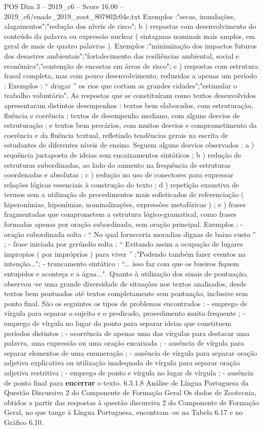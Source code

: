 \begin{textsample}{POS Dim 3 – 2019\_c6 – Score 16.00 – 2019\_c6/enade\_2019\_zoot\_807802c04e.txt}
Exemplos :"secas, inundações, alagamentos";"redução dos níveis de risco"; b ) respostas com desenvolvimento do conteúdo da palavra ou expressão nuclear ( sintagmas nominais mais amplos, em geral de mais de quatro palavras ).
Exemplos :"minimização dos impactos futuros dos desastres ambientais";"fortalecimento das resiliências ambiental, social e econômica";"contenção de encostas em áreas de risco"; c ) respostas com estrutura frasal completa, mas com pouco desenvolvimento, reduzidas a apenas um período : Exemplos : “ dragar ” os rios que cortam as grandes cidades";"estimular o trabalho voluntário".
As respostas que se constituíram como textos desenvolvidos apresentaram distintos desempenhos : textos bem elaborados, com estruturação, fluência e coerência ; textos de desempenho mediano, com alguns desvios de estruturação ; e textos bem precários, com muitos desvios e comprometimento da coerência e da fluência textual, refletindo tendências gerais na escrita de estudantes de diferentes níveis de ensino.
Seguem alguns desvios observados : a ) sequência justaposta de ideias sem encaixamentos sintáticos ; b ) redução de estruturas subordinadas, ao lado do aumento na frequência de estruturas coordenadas e absolutas ; c ) redução no uso de conectores para expressar relações lógicas essenciais à construção do texto ; d ) repetição exaustiva de termos sem a utilização de procedimentos mais sofisticados de referenciação ( hiperonímias, hiponímias, nominalizações, expressões metafóricas ) ; e ) frases fragmentadas que comprometem a estrutura lógico-gramatical, como frases formadas apenas por oração subordinada, sem oração principal.
Exemplos : - oração subordinada solta : “ No qual forneceria moradias dignas de baixo custo ” ; - frase iniciada por gerúndio solta : “ Evitando assim a ocupação de lugares impropios ( por impróprios ) para viver ” ;"Podendo também fazer eventos na intenção..."; - truncamento sintático : “... isso faz com que os bueiros fiquem entupidos e aconteça e a água...".
Quanto à utilização dos sinais de pontuação, observou -se uma grande diversidade de situações nos textos analisados, desde textos bem pontuados até textos completamente sem pontuação, inclusive sem ponto final.
São os seguintes os tipos de problemas encontrados : - emprego de vírgula para separar o sujeito e o predicado, procedimento muito frequente ; - emprego de vírgula no lugar do ponto para separar ideias que constituem períodos distintos ; - ocorrência de apenas uma das vírgulas para destacar uma palavra, uma expressão ou uma oração encaixada ; - ausência de vírgula para separar elementos de uma enumeração ; - ausência de vírgula para separar oração adjetiva explicativa ou utilização inadequada de vírgula para separar oração adjetiva restritiva ; - emprego de ponto e vírgula no lugar de vírgula ; - ausência de ponto final para \textbf{encerrar} o texto. 6.3.1.8 Análise de Língua Portuguesa da Questão Discursiva 2 do Componente de Formação Geral Os dados de Zootecnia, obtidos a partir das respostas à questão discursiva 2 do Componente de Formação Geral, no que tange à Língua Portuguesa, encontram -se na Tabela 6.17 e no Gráfico 6.10.

\end{textsample}
